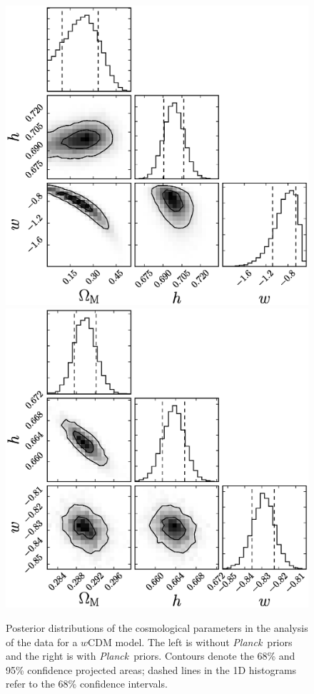 \documentclass[12pt,a4paper]{article}
\newcommand\Planck{{\it Planck}\ }
\begin{document}
\begin{figure}
  \includegraphics[width=0.5\linewidth]{figures/betoule_wcdm_noprior_corner.eps}
  \includegraphics[width=0.5\linewidth]{figures/betoule_wcdm_withprior_corner.eps}
  \caption{Posterior distributions of the cosmological parameters in the
    analysis of the \citet{betoule2014} data for a $w$CDM model. The left is without 
    \Planck priors and the right is with \Planck priors. Contours denote the
    68\% and 95\% confidence projected areas; dashed lines in
    the 1D histograms refer to the 68\% confidence intervals.}
  \label{fig:betoule_wcdm_corner}
\end{figure}
%
\end{document}
